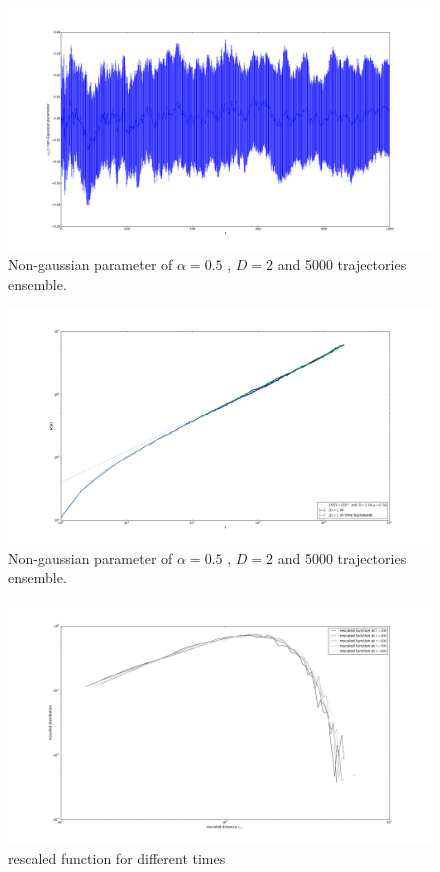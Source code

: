 \documentclass[
  a4paper,BCOR10mm,oneside,
  bibtotoc,idxtotoc,
  headsepline,footsepline,%
  fleqn,openbib
]{scrbook}
\begin{document}
\begin{figure}[h]
\includegraphics[width=\textwidth]{./non_gaussian_D=2_t=1001_dt=1_alpha=05particles_5000_std01.pdf}
\caption{Non-gaussian parameter of $\alpha=0.5$ , $ D=2 $ and 5000 trajectories ensemble.}
 \centering
\end{figure}

\begin{figure}[h]
\includegraphics[width=\textwidth]{./msd_ensemble_t_inverted.pdf}
\caption{Non-gaussian parameter of $\alpha=0.5$ , $ D=2 $ and 5000 trajectories ensemble.}
 \centering
\end{figure}

\begin{figure}[h]
\includegraphics[width=\textwidth]{./rescaled_function.pdf}
\caption{rescaled function for different times}
 \centering
\end{figure}
\end{document}

